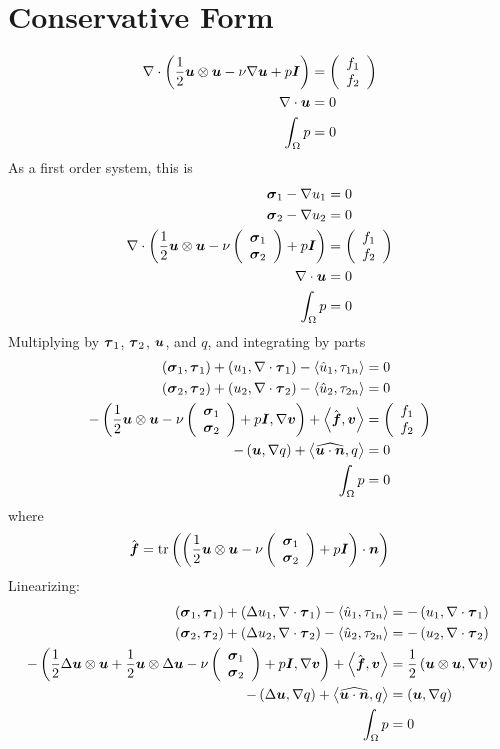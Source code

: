 \documentclass{article}
\begin{document}
\section*{Conservative Form}
\begin{align*}
  \Div\LRp{\frac{1}{2}\bfu\otimes\bfu-\nu\Grad\bfu+p\bfI}&=\vecttwo{f_1}{f_2}\\
  \Div\bfu&=0\\
  \int_\Omega p&=0
\end{align*}
As a first order system, this is
\begin{align*}
  \bfsigma_1-\Grad u_1&=0\\
  \bfsigma_2-\Grad u_2&=0\\
  \Div\LRp{\frac{1}{2}\bfu\otimes\bfu-\nu\vecttwo{\bfsigma_1}{\bfsigma_2}+p\bfI}&=\vecttwo{f_1}{f_2}\\
  \Div\bfu&=0\\
  \int_\Omega p&=0
\end{align*}
Multiplying by $\bftau_1$, $\bftau_2$, $\bfu$, and $q$, and integrating by
parts
\begin{align*}
  \LRp{\bfsigma_1,\bftau_1}
  +\LRp{u_1,\Div\bftau_1}
  -\LRa{\hat u_1,\tau_{1n}}&=0\\
  \LRp{\bfsigma_2,\bftau_2}
  +\LRp{u_2,\Div\bftau_2}
  -\LRa{\hat u_2,\tau_{2n}}&=0\\
  -\LRp{\frac{1}{2}\bfu\otimes\bfu-\nu\vecttwo{\bfsigma_1}{\bfsigma_2}+p\bfI,\Grad\bfv}
  +\LRa{\hat\bff,\bfv}
  &=\vecttwo{f_1}{f_2}\\
  -\LRp{\bfu,\Grad q}
  +\LRa{\widehat{\bfu\cdot\bfn},q}&=0\\
  \int_\Omega p&=0
\end{align*}
where
\[
\hat\bff=\trace\LRp{\LRp{\frac{1}{2}\bfu\otimes\bfu-\nu\vecttwo{\bfsigma_1}{\bfsigma_2}+p\bfI}\cdot\bfn}
\]
Linearizing:
\begin{align*}
  \LRp{\bfsigma_1,\bftau_1}
  +\LRp{\Delta u_1,\Div\bftau_1}
  -\LRa{\hat u_1,\tau_{1n}}
  &=-\LRp{u_1,\Div\bftau_1}
  \\
  \LRp{\bfsigma_2,\bftau_2}
  +\LRp{\Delta u_2,\Div\bftau_2}
  -\LRa{\hat u_2,\tau_{2n}}
  &=-\LRp{u_2,\Div\bftau_2}
  \\
  -\LRp{\frac{1}{2}\Delta\bfu\otimes\bfu+\frac{1}{2}\bfu\otimes\Delta\bfu-\nu\vecttwo{\bfsigma_1}{\bfsigma_2}+p\bfI,\Grad\bfv}
  +\LRa{\hat\bff,\bfv}
  &=\frac{1}{2}\LRp{\bfu\otimes\bfu,\Grad\bfv}
  \\
  -\LRp{\Delta\bfu,\Grad q}
  +\LRa{\widehat{\bfu\cdot\bfn},q}
  &=\LRp{\bfu,\Grad q}
  \\
  \int_\Omega p&=0
\end{align*}
\end{document}
